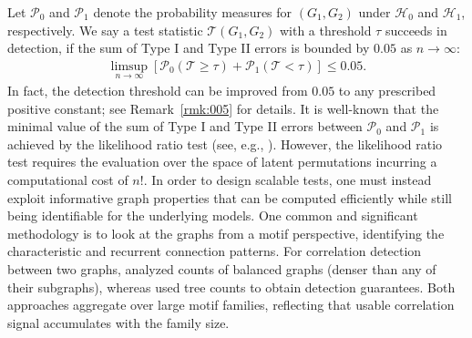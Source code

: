\documentclass[letterpaper,11pt]{article}
\theoremstyle{definition}
\newcommand{\maH}{\mathcal{H}}
\newcommand{\maP}{\mathcal{P}}
\newcommand{\maT}{\mathcal{T}}
\newcommand{\nbr}[1]{{\sf\color{red}[#1]}}
\newcommand{\remarkhd}[1]{{\sf\color{magenta}[#1]}}
\newcommand{\qth}[1]{\left[ #1 \right]}
\newcommand{\calP}{{\mathcal{P}}}
\newcommand{\TV}{\mathsf{TV}}
\begin{document}
Let $\maP_0$ and $\maP_1$ denote the probability measures for $(G_1,G_2)$ under $\maH_0$ and $\maH_1$, respectively. We say a test statistic $\maT(G_1,G_2)$ with a threshold $\tau$ succeeds in detection, if the sum of Type I and Type II errors is bounded by $0.05$ as $n\to \infty$:
\begin{align}\label{eq:detection-cretiria}
    \limsup_{n\to \infty}\qth{\maP_0(\maT\ge\tau)+\maP_1(\maT< \tau)}\le 0.05.
\end{align}
%
%
%
%
%
In fact, the detection threshold can be improved from $0.05$ to any prescribed positive constant; see Remark~\ref{rmk:005} for details.
It is well-known that the minimal value of the sum of Type I and Type II errors between $\maP_0$ and $\maP_1$ is achieved by the likelihood ratio test (see, e.g., \cite[Theorem 13.1.1]{lehmann2005testing}). %
However, the likelihood ratio test requires the evaluation over the space of latent permutations incurring a computational cost of $n!$.
In order to design scalable tests, one must instead exploit informative graph properties that can be computed efficiently while still being identifiable for the underlying models. 
One common and significant methodology is to look at the graphs from a motif perspective, identifying the characteristic and recurrent connection patterns.
For correlation detection between two graphs, \cite{barak2019nearly} analyzed counts of balanced graphs (denser than any of their subgraphs), whereas \cite{mao2024testing} used tree counts to obtain detection guarantees. Both approaches aggregate over large motif families, reflecting that usable correlation signal accumulates with the family size.
\end{document}
